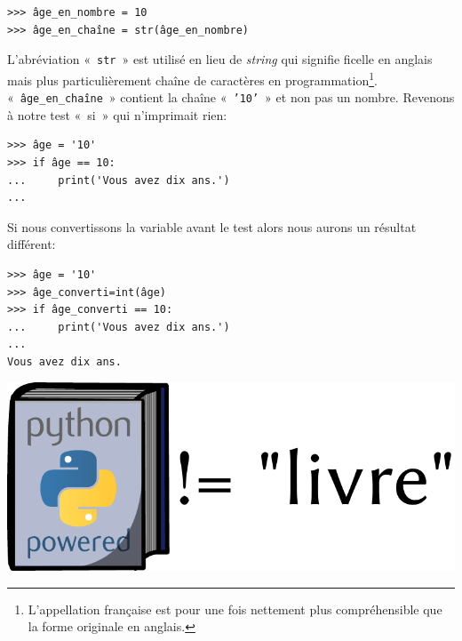 \begin{Verbatim}[frame=single,rulecolor=\color{mbleu}, label=à taper]
>>> âge_en_nombre = 10
>>> âge_en_chaîne = str(âge_en_nombre)
\end{Verbatim}

L'abréviation «~\texttt{str}~» est utilisé en lieu de \emph{string} qui signifie ficelle en anglais mais plus particulièrement chaîne de caractères en programmation\footnote{L'appellation française est pour une fois nettement plus compréhensible que la forme originale en anglais.}.\\

«~\texttt{âge\_en\_chaîne}~» contient la chaîne «~\texttt{'10'}~» et non pas un nombre. Revenons à notre test «~si~» qui n'imprimait rien:

\begin{Verbatim}[frame=single,rulecolor=\color{green}, label=à taper avec attention]
>>> âge = '10'
>>> if âge == 10:
...     print('Vous avez dix ans.')
...
\end{Verbatim}

Si nous convertissons la variable avant le test alors nous aurons un résultat différent:

\begin{Verbatim}[frame=single,rulecolor=\color{green}, label=à taper avec attention]
>>> âge = '10'
>>> âge_converti=int(âge)
>>> if âge_converti == 10:
...     print('Vous avez dix ans.')
...
Vous avez dix ans.
\end{Verbatim}

\vfill
\begin{center}
\includegraphics[scale=1]{images/livre.pdf} 
\end{center}
\vfill

\clearemptydoublepage